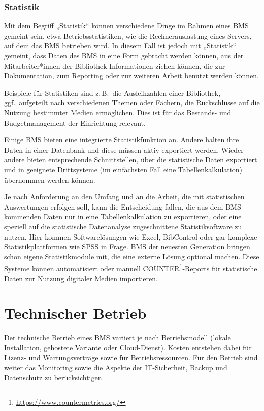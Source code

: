 \documentclass[
  11pt,
  letterpaper,
  DIV=11,
  twoside]{scrreprt}
\DeclareRobustCommand{\href}[2]{#2\footnote{\url{#1}}}
\begin{document}
\subsubsection{Statistik}\label{statistik}

Mit dem Begriff „Statistik`` können verschiedene Dinge im Rahmen eines
BMS gemeint sein, etwa Betriebsstatistiken, wie die Rechnerauslastung
eines Servers, auf dem das BMS betrieben wird. In diesem Fall ist jedoch
mit „Statistik`` gemeint, dass Daten des BMS in eine Form gebracht
werden können, aus der Mitarbeiter*innen der Bibliothek Informationen
ziehen können, die zur Dokumentation, zum Reporting oder zur weiteren
Arbeit benutzt werden können.

Beispiele für Statistiken sind z.\,B.~die Ausleihzahlen einer
Bibliothek, ggf.~aufgeteilt nach verschiedenen Themen oder Fächern, die
Rückschlüsse auf die Nutzung bestimmter Medien ermöglichen. Dies ist für
das Bestands- und Budgetmanagement der Einrichtung relevant.

Einige BMS bieten eine integrierte Statistikfunktion an. Andere halten
ihre Daten in einer Datenbank und diese müssen aktiv exportiert werden.
Wieder andere bieten entsprechende Schnittstellen, über die statistische
Daten exportiert und in geeignete Drittsysteme (im einfachsten Fall eine
Tabellenkalkulation) übernommen werden können.

Je nach Anforderung an den Umfang und an die Arbeit, die mit
statistischen Auswertungen erfolgen soll, kann die Entscheidung fallen,
die aus dem BMS kommenden Daten nur in eine Tabellenkalkulation zu
exportieren, oder eine speziell auf die statistische Datenanalyse
zugeschnittene Statistiksoftware zu nutzen. Hier kommen Softwarelösungen
wie Excel, BibControl oder gar komplexe Statistikplattformen wie SPSS in
Frage. BMS der neuesten Generation bringen schon eigene Statistikmodule
mit, die eine externe Lösung optional machen. Diese Systeme können
automatisiert oder manuell
\href{https://www.countermetrics.org/}{COUNTER}-Reports für statistische
Daten zur Nutzung digitaler Medien importieren.

\section{Technischer Betrieb}\label{sec-technischer-betrieb}

Der technische Betrieb eines BMS variiert je nach
\hyperref[sec-betriebsmodelle]{Betriebsmodell} (lokale Installation,
gehostete Variante oder Cloud-Dienst). \hyperref[kosten]{Kosten}
entstehen dabei für Lizenz- und Wartungsverträge sowie für
Betriebsressourcen. Für den Betrieb sind weiter das
\hyperref[monitoring]{Monitoring} sowie die Aspekte der
\hyperref[it-sicherheit]{IT-Sicherheit},
\hyperref[backup-und-rollback]{Backup} und
\hyperref[datenschutz-etc]{Datenschutz} zu berücksichtigen.
\end{document}
